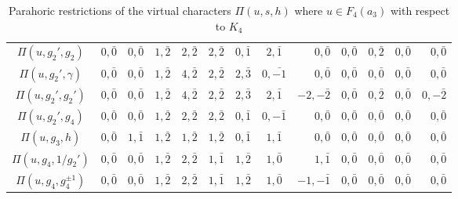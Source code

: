 \begin{landscape}
\begin{table}[!ht]
{\begin{tabular}{|c|cccc|cccR|cccR|}
        $\Pi(u,g_2',g_2)$ & $0,\bar0$ & $0,\bar0$ & $1,\bar2$ & $2,\bar2$ & $2,\bar2$ & $0,\bar1$ & $2,\bar1$ & $0,\bar0$ & $0,\bar0$ & $0,\bar2$ & $0,\bar0$ & $0,\bar0$\\

        $\Pi(u,g_2',\gamma)$ & $0,\bar0$ & $0,\bar0$ & $1,\bar2$ & $4,\bar2$ & $2,\bar2$ & $2,\bar{3}$ & $0,\bar{-1}$ & $0,\bar0$ & $0,\bar0$ & $0,\bar0$ & $0,\bar0$ & $0,\bar0$\\

        $\Pi(u,g_2',g_2')$ & $0,\bar0$ & $0,\bar0$ & $1,\bar2$ & $4,\bar2$ & $2,\bar2$ & $2,\bar{3}$ & $2,\bar1$ & $-2,-\bar2$ & $0,\bar0$ & $0,\bar2$ & $0,\bar0$ & $0,-\bar2$\\

        $\Pi(u,g_2',g_4)$  & $0,\bar0$ & $0,\bar0$ & $1,\bar2$ & $2,\bar2$ & $2,\bar2$ & $0,\bar1$ & $0,-\bar1$ & $0,\bar0$ & $0,\bar0$ & $0,\bar0$ & $0,\bar0$ & $0,\bar0$ \\\hline

        $\Pi(u,g_3,h)$  & $0,\bar0$ & $1,\bar1$ & $1,\bar2$ & $1,\bar2$ & $1,\bar2$ & $0,\bar1$ & $1,\bar1$ & $0,\bar0$ & $0,\bar0$ & $0,\bar0$ & $0,\bar0$ & $0,\bar0$ \\\hline
        $\Pi(u,g_4,1/g_2')$ & {$0,\bar0$} & {$0,\bar0$} & {$1,\bar2$} & {$2,\bar2$} & {$1,\bar1$} & {$1,\bar2$} & {$1,\bar0$} & {$1,\bar1$} & {$0,\bar0$} & {$0,\bar0$} & {$0,\bar0$} & {$0,\bar0$} \\
        $\Pi(u,g_4,g_4^{\pm1})$ & {$0,\bar0$} & {$0,\bar0$} & {$1,\bar2$} & {$2,\bar2$} & {$1,\bar1$} & {$1,\bar2$} & {$1,\bar0$} & {$-1,-\bar1$} & {$0,\bar0$} & {$0,\bar0$} & {$0,\bar0$} & {$0,\bar0$} \\\hline
        \end{tabular}
        }
        \caption{Parahoric restrictions of the virtual characters $\Pi(u,s,h)$ where $u\in F_4(a_3)$ with respect to $K_4$}
    \end{table}

\end{landscape}

